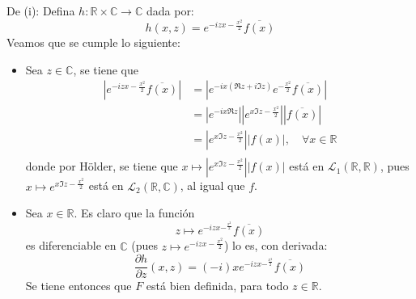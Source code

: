 \documentclass[12pt]{report}
\theoremstyle{largebreak}
\newcommand\abs[1]{\ensuremath{\left|#1\right|}}
\newcommand\cf[3]{\ensuremath{#1:#2\rightarrow#3}}
\newcommand\conj[1]{\ensuremath{\overline{#1}}}
\begin{document}
    \begin{sol}
        De (i): Defina $\cf{h}{\mathbb{R}\times\mathbb{C}}{\mathbb{C}}$ dada por:
        \begin{equation*}
            h(x,z)=e^{ -izx-\frac{x^2}{2}}\conj{f(x)}
        \end{equation*}
        Veamos que se cumple lo siguiente:
        \begin{itemize}
            \item Sea $z\in\mathbb{C}$, se tiene que
            \begin{equation*}
                \begin{split}
                    \abs{e^{ -izx-\frac{x^2}{2}}\conj{f(x)}}&=\abs{e^{ -ix(\Re z+i\Im z)}e^{-\frac{x^2}{2}}\conj{f(x)}}\\
                    &=\abs{e^{-ix\Re z}}\abs{e^{x\Im z-\frac{x^2}{2}}}\abs{\conj{f(x)}}\\
                    &=\abs{e^{x\Im z-\frac{x^2}{2}}}\abs{f(x)},\quad\forall x\in\mathbb{R} \\
                \end{split}
            \end{equation*}
            donde por Hölder, se tiene que $x\mapsto \abs{e^{x\Im z-\frac{x^2}{2}}}\abs{f(x)}$ está en $\mathcal{L}_1(\mathbb{R},\mathbb{R})$, pues $x\mapsto e^{x\Im z-\frac{x^2}{2}}$ está en $\mathcal{L}_2(\mathbb{R},\mathbb{C})$, al igual que $f$.
            \item Sea $x\in\mathbb{R}$. Es claro que la función
            \begin{equation*}
                z\mapsto e^{-izx-^{\frac{x^2}{2}}}\conj{f(x)} 
            \end{equation*}
            es diferenciable en $\mathbb{C}$ (pues $z\mapsto e^{-izx-\frac{x^2}{2}}$) lo es, con derivada:
            \begin{equation*}
                \frac{\partial h}{\partial z}(x,z)=(-i)xe^{-izx-^{\frac{x^2}{2}}}\conj{f(x)}
            \end{equation*}
            Se tiene entonces que $F$ está bien definida, para todo $z\in\mathbb{R}$.


\end{itemize}
\end{sol}
\end{document}

